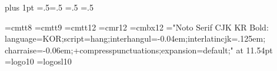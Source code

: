 %



\pdffalse \dvipdffalse        %
\parskip=0pt plus 1pt
\parindent=18pt
\abovedisplayskip=.5\abovedisplayskip  \belowdisplayskip=.5\belowdisplayskip
\abovedisplayshortskip=.5\abovedisplayshortskip
\belowdisplayshortskip=.5\belowdisplayshortskip

\font\eighttt=cmtt8
\font\ninett=cmtt9
\font\twelvett=cmtt12
\font\latinauthorfont=cmr12
\font\latinchapterfont=cmbx12
\sethangulfont\twelvebd="Noto Serif CJK KR Bold:%
  language=KOR;script=hang;interhangul=-0.04em;interlatincjk=.125em;%
  charraise=-0.06em;+compresspunctuations;expansion=default;" at 11.54pt
\def\authorfont{\latinauthorfont\twelvemj}
\def\chapterfont{\latinchapterfont\twelvebd}
\font\tenlogo=logo10 \font\tensllogo=logosl10
\def\MF{{\tenlogo META}\-{\tenlogo FONT}}
\def\slMF{{\tensllogo META}\-{\tensllogo FONT}}

\def\cw#1{{\tt #1}}
\def\bs{\char92 }                              %
\def\rn#1{$\langle\,${\it #1\/}$\,\rangle$}    %

\def\chapter#1{\penalty-500\bigskip
  \centerline{\chapterfont\def\.##1{{\twelvett##1}}#1}\nobreak\vskip 6pt}
\def\section#1{\medskip\noindent{\bf #1.}\enspace\ignorespaces}

